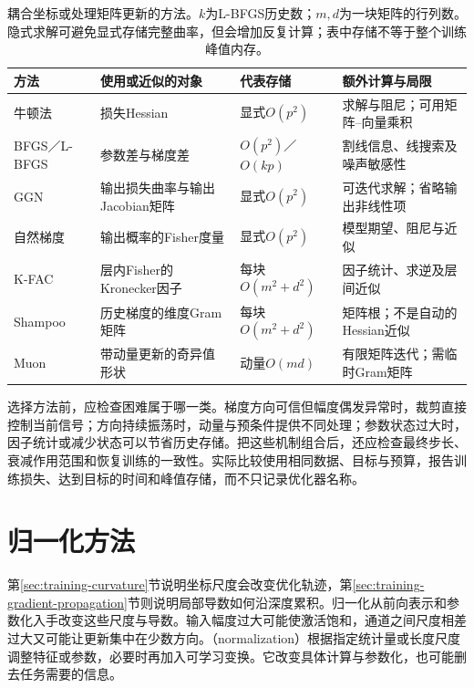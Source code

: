 \begin{table}[htbp]
  \centering\small
  \begin{tabularx}{\linewidth}{@{}p{27mm}p{43mm}p{31mm}X@{}}
    \toprule
    方法 & 使用或近似的对象 & 代表存储 & 额外计算与局限 \\
    \midrule
    牛顿法 & 损失Hessian & 显式$O(p^2)$ & 求解与阻尼；可用矩阵--向量乘积 \\
    BFGS／L-BFGS & 参数差与梯度差 & $O(p^2)$／$O(kp)$ & 割线信息、线搜索及噪声敏感性 \\
    GGN & 输出损失曲率与输出Jacobian矩阵 & 显式$O(p^2)$ & 可迭代求解；省略输出非线性项 \\
    自然梯度 & 输出概率的Fisher度量 & 显式$O(p^2)$ & 模型期望、阻尼与近似 \\
    K-FAC & 层内Fisher的Kronecker因子 & 每块$O(m^2+d^2)$ & 因子统计、求逆及层间近似 \\
    Shampoo & 历史梯度的维度Gram矩阵 & 每块$O(m^2+d^2)$ & 矩阵根；不是自动的Hessian近似 \\
    Muon & 带动量更新的奇异值形状 & 动量$O(md)$ & 有限矩阵迭代；需临时Gram矩阵 \\
    \bottomrule
  \end{tabularx}
  \caption{耦合坐标或处理矩阵更新的方法。$k$为L-BFGS历史数；$m,d$为一块矩阵的行列数。隐式求解可避免显式存储完整曲率，但会增加反复计算；表中存储不等于整个训练峰值内存。}
  \label{tab:training-matrix-comparison}
\end{table}
\FloatBarrier

选择方法前，应检查困难属于哪一类。梯度方向可信但幅度偶发异常时，裁剪直接控制当前信号；方向持续振荡时，动量与预条件提供不同处理；参数状态过大时，因子统计或减少状态可以节省历史存储。把这些机制组合后，还应检查最终步长、衰减作用范围和恢复训练的一致性。实际比较使用相同数据、目标与预算，报告训练损失、达到目标的时间和峰值存储，而不只记录优化器名称。

\section{归一化方法}
\label{sec:training-normalization}
第\ref{sec:training-curvature}节说明坐标尺度会改变优化轨迹，第\ref{sec:training-gradient-propagation}节则说明局部导数如何沿深度累积。归一化从前向表示和参数化入手改变这些尺度与导数。输入幅度过大可能使激活饱和，通道之间尺度相差过大又可能让更新集中在少数方向。（normalization）根据指定统计量或长度尺度调整特征或参数，必要时再加入可学习变换。它改变具体计算与参数化，也可能删去任务需要的信息。

